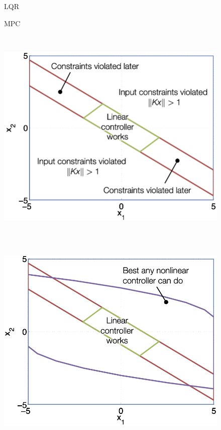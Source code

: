 \documentclass[
  letterpaper,
  DIV=11,
  numbers=noendperiod,
  oneside]{scrartcl}
\begin{document}

\subsection{}\label{section-31}

\begin{figure}

\begin{minipage}{0.50\linewidth}
LQR\end{minipage}%
%
\begin{minipage}{0.50\linewidth}
MPC\end{minipage}%
\newline
\begin{minipage}{0.50\linewidth}
\includegraphics[width=\textwidth,height=4.16667in]{figs/lqr_constrainedSS.png}\end{minipage}%
%
\begin{minipage}{0.50\linewidth}
\includegraphics[width=\textwidth,height=4.16667in]{figs/mpc_constrainedSS.png}\end{minipage}%


\end{figure}
\end{document}
